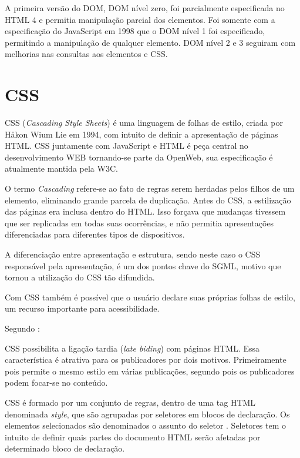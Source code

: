 \documentclass[
12pt,
a4paper,
portuges,
draft
]{report}
\renewenvironment{quote}
               {\list{}{\rightmargin\leftmargin}%
                \item\relax\fontsize{10}{12}}
               {\endlist}
\begin{document}
A primeira versão do DOM, DOM nível zero, foi parcialmente
especificada no HTML 4 e permitia manipulação parcial dos elementos.
Foi somente com a especificação do JavaScript em 1998 que o DOM nível 1 foi especificado,
permitindo a manipulação de qualquer elemento. DOM nível 2 e 3 seguiram com melhorias nas
consultas aos elementos e CSS.

\section{CSS}

CSS (\textit{Cascading Style Sheets}) é uma linguagem de folhas de
estilo, criada por Håkon Wium Lie em 1994, com intuito de definir a
apresentação de páginas HTML. CSS juntamente com JavaScript e HTML
é peça central no desenvolvimento WEB tornando-se parte da OpenWeb,
sua especificação é atualmente mantida pela W3C.

O termo \textit{Cascading} refere-se ao fato de regras serem herdadas
pelos filhos de um elemento, eliminando grande parcela de duplicação.
Antes do CSS, a estilização das páginas era inclusa dentro do HTML.
Isso forçava que mudanças tivessem que ser replicadas em todas suas
ocorrências, e não permitia apresentações diferenciadas para
diferentes tipos de dispositivos.

A diferenciação entre apresentação e estrutura, sendo neste caso o
CSS responsável pela apresentação, é um dos pontos chave do SGML,
motivo que tornou a utilização do CSS tão difundida.

Com CSS também é possível que o usuário declare suas próprias
folhas de estilo, um recurso importante para acessibilidade.

Segundo \cite[pp. 23--24]{CascadingStyleSheets}:

\begin{quote}
CSS possibilita a ligação tardia (\textit{late biding}) com
páginas HTML. Essa característica é atrativa para os publicadores
por dois motivos. Primeiramente pois permite o mesmo estilo em várias
publicações, segundo pois os publicadores podem focar-se no conteúdo.
\end{quote}

CSS é formado por um conjunto de regras,
dentro de uma tag HTML denominada \textit{style}, que são agrupadas
por seletores em blocos de declaração. Os elementos selecionados são
denominados o assunto do seletor \autocite{cssSelectors}. Seletores tem
o intuito de definir quais partes do documento HTML serão afetadas por
determinado bloco de declaração.
\end{document}
